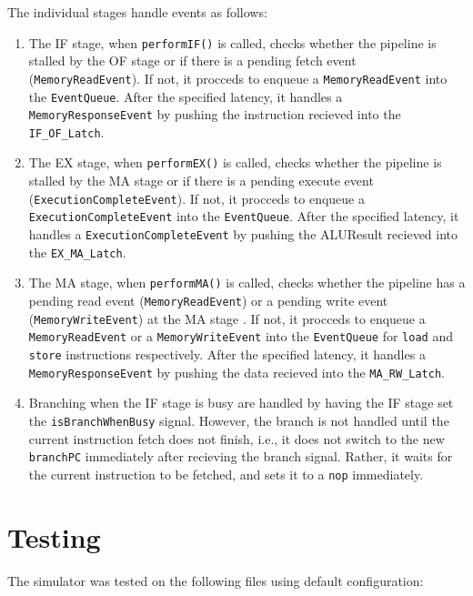 \documentclass[12pt,a4paper]{article}
\begin{document}
The individual stages handle events as follows:
\begin{enumerate}
    \item The IF stage, when \texttt{performIF()} is called, checks whether the pipeline is stalled by the OF stage or if there is a pending fetch event (\texttt{MemoryReadEvent}). If not, it procceds to enqueue a \texttt{MemoryReadEvent} into the \texttt{EventQueue}. After the specified latency, it handles a \texttt{MemoryResponseEvent} by pushing the instruction recieved into the \texttt{IF\_OF\_Latch}.
    	
   \item The EX stage, when \texttt{performEX()} is called, checks whether the pipeline is stalled by the MA stage or if there is a pending execute event (\texttt{ExecutionCompleteEvent}). If not, it procceds to enqueue a \texttt{ExecutionCompleteEvent} into the \texttt{EventQueue}. After the specified latency, it handles a \texttt{ExecutionCompleteEvent} by pushing the ALUResult recieved into the \texttt{EX\_MA\_Latch}.
   
    \item The MA stage, when \texttt{performMA()} is called, checks whether the pipeline has a pending read event (\texttt{MemoryReadEvent}) or a pending write event (\texttt{MemoryWriteEvent}) at the MA stage . If not, it procceds to enqueue a \texttt{MemoryReadEvent} or a \texttt{MemoryWriteEvent} into the \texttt{EventQueue} for \texttt{load} and \texttt{store} instructions respectively. After the specified latency, it handles a \texttt{MemoryResponseEvent} by pushing the data recieved into the \texttt{MA\_RW\_Latch}.
    
    \item Branching when the IF stage is busy are handled by having the IF stage set the \texttt{isBranchWhenBusy} signal. However, the branch is not handled until the current instruction fetch does not finish, i.e., it does not switch to the new \texttt{branchPC} immediately after recieving the branch signal. Rather, it waits for the current instruction to be fetched, and sets it to a \texttt{nop} immediately.
    
\end{enumerate}


\section{Testing}
The simulator was tested on the following files using default configuration:
\end{document}
